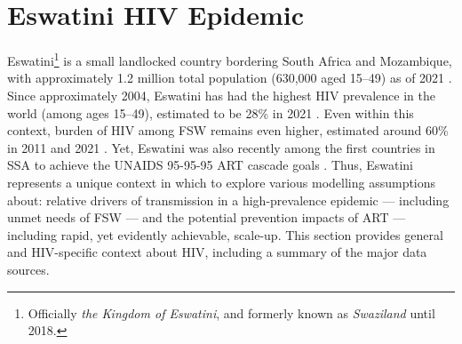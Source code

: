 \section{Eswatini HIV Epidemic}\label{intro.esw}
Eswatini\footnote{Officially \emph{the Kingdom of Eswatini},
  and formerly known as \emph{Swaziland} until 2018.}
is a small landlocked country bordering South Africa and Mozambique,
with approximately 1.2 million total population (630,000 aged 15--49) as of 2021 \cite{DataBank}.
Since approximately 2004, Eswatini has had
the highest HIV prevalence in the world (among ages 15--49),
estimated to be 28\% in 2021 \cite{DataBank,AIDSinfo}.
Even within this context, burden of HIV among FSW remains even higher,
estimated around 60\% in 2011 and 2021 \cite{Baral2014,EswIBBS2022}.
Yet, Eswatini was also recently among the first countries in SSA
to achieve the UNAIDS 95-95-95 ART cascade goals \cite{959595,AIDSinfo}.
Thus, Eswatini represents a unique context in which to explore
various modelling assumptions about:
relative drivers of transmission in a high-prevalence epidemic --- including unmet needs of FSW ---
and the potential prevention impacts of ART --- including rapid, yet evidently achievable, scale-up.
This section provides general and HIV-specific context about HIV,
including a summary of the major data sources.
